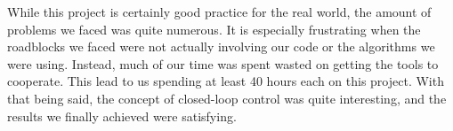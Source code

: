 \documentclass[11pt]{article}
\begin{document}
While this project is certainly good practice for the real world, the amount of problems we faced was quite numerous.  It is especially frustrating when the roadblocks we faced were not actually involving our code or the algorithms we were using.  Instead, much of our time was spent wasted on getting the tools to cooperate.  This lead to us spending at least 40 hours each on this project.  With that being said, the concept of closed-loop control was quite interesting, and the results we finally achieved were satisfying. 
	
\end{document}
